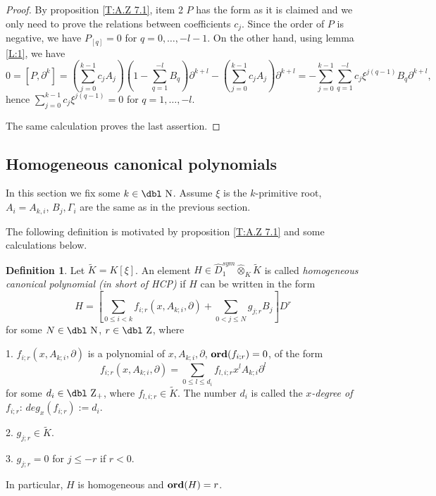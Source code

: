 \documentclass[11pt]{article}
\theoremstyle{definition}
\newcommand{\dz}{{\mbox{\dbl Z}}}
\newcommand{\dn}{{\mbox{\dbl N}}}
\newcommand{\Ord}{\mathop {\rm \bf ord}}
\newtheorem{Def}{Definition}[section]
\theoremstyle{plain}
\numberwithin{equation}{section}
\begin{document}
\begin{proof}
	By proposition \ref{T:A.Z 7.1}, item 2 $P$ has the form as it is claimed and we only need to prove the relations between coefficients $c_j$. 
	Since the order of $P$ is negative, we have $P_{[q]}=0$ for $q=0, \ldots , -l-1$. On the other hand, using lemma \ref{L:1}, we have
	$$
	0=[P,\partial^{k}]= (\sum_{j=0}^{k-1}c_jA_j)(1-\sum_{q=1}^{-l}B_{q})\partial^{k+l}-(\sum_{j=0}^{k-1}c_jA_j)\partial^{k+l}= -\sum_{j=0}^{k-1}\sum_{q=1}^{-l}c_j\xi^{j(q-1)}B_q\partial^{k+l},
	$$
	hence $\sum_{j=0}^{k-1}c_j\xi^{j(q-1)}=0$ for $q=1, \ldots , -l$. 
	
	The same calculation proves the last assertion.
\end{proof}




\subsection{Homogeneous canonical polynomials}
\label{S:HCP}

In this section we fix some $k\in \dn$. Assume $\xi$ is the $k$-primitive root, $A_i=A_{k,i}$, $B_j,\Gamma_i$ are the same as in the previous section.  

The following definition is motivated by proposition \ref{T:A.Z 7.1} and some calculations below. 

\begin{Def}
\label{D:HCP}
Let $\tilde{K}=K[\xi]$. An element $H\in \hat{D}_{1}^{sym}\hat{\otimes}_K\tilde{K}$ is  called {\it homogeneous canonical polynomial  (in short of HCP)}  if $H$ can be written in the form
	\begin{equation}
	\label{E:HCP}
	H=[\sum_{0\leq i<k}f_{i;r}(x, A_{k;i}, \partial )+\sum_{0<j\leq N}g_{j;r}B_{j}]D^{r}
	\end{equation}
	for some $N\in\dn$, $r\in \dz$, where 
	
		1. $f_{i;r}(x, A_{k;i}, \partial)$ is a polynomial of $x, A_{k;i},\partial$,  $\Ord(f_{i;r})=0$,  of the form
		$$
		f_{i;r}(x, A_{k;i}, \partial )=\sum_{0\leq l\leq d_{i}}f_{l,i;r}x^l A_{k;i}\partial^l
		$$
		for some $d_i\in \dz_+$, where $f_{l,i;r}\in \tilde{K}$. The number  $d_i$ is called the {\it $x$-degree of $f_{i;r}$}:  $deg_{x}(f_{i;r}):= d_i$.
		
		2. $g_{j;r}\in \tilde{K}$.
		
		3. $g_{j;r}=0$ for $j\le -r$ if $r<0$. 
	
	
In particular, $H$ is homogeneous and $\Ord (H)=r$. 
\end{Def}
\end{document}

